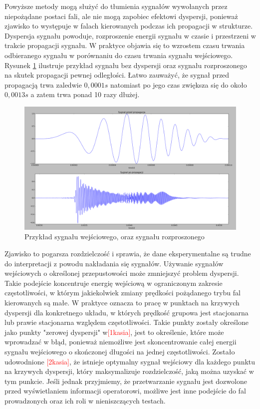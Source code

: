 Powyższe metody mogą służyć do tłumienia sygnałów wywołanych przez niepożądane postaci fali, ale nie mogą zapobiec efektowi dyspersji, ponieważ zjawisko to występuje w falach kierowanych podczas ich propagacji w strukturze. Dyspersja sygnału powoduje, rozproszenie energii sygnału w czasie i przestrzeni w trakcie propagacji sygnału. W praktyce objawia się to wzrostem czasu trwania odbieranego sygnału w porównaniu do czasu trwania sygnału wejściowego. Rysunek \ref{fig:dyspersja} ilustruje przykład sygnału bez dyspersji oraz sygnału rozproszonego na skutek propagacji pewnej odległości. Łatwo zauważyć, że sygnał przed propagacją trwa zaledwie $0,0001 s$ natomiast po jego czas zwiększa się do około $0,0013s$ a zatem trwa ponad 10 razy dłużej.
\begin{figure}[h]
\centering
\includegraphics[width=14cm]{Zdjecia/4/dyspersja}
\caption{Przykład sygnału wejściowego, oraz sygnału rozproszonego}
\label{fig:dyspersja}
\end{figure}

 Zjawisko to pogarsza rozdzielczość i sprawia, że dane eksperymentalne są trudne do interpretacji z powodu nakładania się sygnałów. Używanie sygnałów wejściowych o określonej przepustowości może zmniejszyć problem dyspersji. Takie podejście koncentruje energię wejściową w ograniczonym zakresie częstotliwości, w którym jakiekolwiek zmiany prędkości pożądanego trybu fal kierowanych są małe. W praktyce oznacza to pracę w punktach na krzywych dyspersji dla konkretnego układu, w których prędkość grupowa jest stacjonarna lub prawie stacjonarna względem częstotliwości. Takie punkty zostały określone jako punkty "zerowej dyspersji" w\textcolor{red}{[1kasia]}, jest to określenie, które może wprowadzać w błąd, ponieważ niemożliwe jest skoncentrowanie całej energii sygnału wejściowego o skończonej długości na jednej częstotliwości. Zostało udowodnione \textcolor{red}{[2kasia]}, że istnieje optymalny sygnał wejściowy dla każdego punktu na krzywych dyspersji, który maksymalizuje rozdzielczość, jaką można uzyskać w tym punkcie. Jeśli jednak przyjmiemy, że przetwarzanie sygnału jest dozwolone przed wyświetlaniem informacji operatorowi, możliwe jest inne podejście do fal prowadzonych oraz ich roli w nieniszczących testach.

